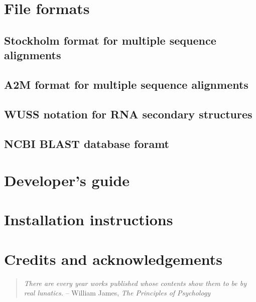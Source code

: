 \documentclass[10pt]{book}
\begin{document}
\chapter{File formats}

\section{Stockholm format for multiple sequence alignments}


\section{A2M format for multiple sequence alignments}



\newpage
\section{WUSS notation for RNA secondary structures}



\newpage
\section{NCBI BLAST database foramt}



\newpage
\chapter{Developer's guide}


\newpage
\chapter{Installation instructions}


\newpage
\chapter{Credits and acknowledgements}
\begin{quote}
\emph{There are every year works published whose contents show them to
  be by real lunatics.}
\hspace*{1em}\hfill -- William James, \emph{The Principles of Psychology}
\end{quote}

\newpage
\newcommand{\bibfont}{\footnotesize}


\end{document}
